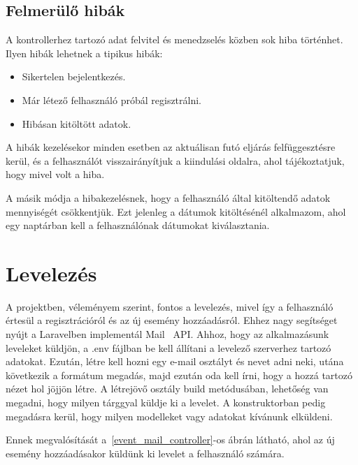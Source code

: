 \documentclass[
]{thesis-ekf}
\theoremstyle{definition}
\theoremstyle{remark}
\begin{document}
	\subsection{Felmerülő hibák}
	A kontrollerhez tartozó adat felvitel és menedzselés közben sok hiba történhet. Ilyen hibák lehetnek a tipikus hibák:
	\begin{itemize}
		\item Sikertelen bejelentkezés. 
		\item Már létező felhasználó próbál regisztrálni.
		\item Hibásan kitöltött adatok.
	\end{itemize}
	A hibák kezelésekor minden esetben az aktuálisan futó eljárás felfüggesztésre kerül, és a felhasználót visszairányítjuk a kiindulási oldalra, ahol tájékoztatjuk, hogy mivel volt a hiba. 
	
	A másik módja a hibakezelésnek, hogy a felhasználó által kitöltendő adatok mennyiségét csökkentjük. Ezt jelenleg a dátumok kitöltésénél alkalmazom, ahol egy naptárban kell a felhasználónak dátumokat kiválasztania. 
	
	\section{Levelezés}
	A projektben, véleményem szerint, fontos a levelezés, mivel így a felhasználó értesül a regisztrációról és az új esemény hozzáadásról. Ehhez nagy segítséget nyújt a Laravelben implementál Mail~\cite{laravel_mail} API. Ahhoz, hogy az alkalmazásunk leveleket küldjön, a .env fájlban be kell állítani a levelező szerverhez tartozó adatokat. Ezután, létre kell hozni egy e-mail osztályt és nevet adni neki, utána következik a formátum megadás, majd ezután oda kell írni, hogy a hozzá tartozó nézet hol jöjjön létre. A létrejövő osztály build metódusában, lehetőség van megadni, hogy milyen tárggyal küldje ki a levelet. A konstruktorban pedig megadásra kerül, hogy milyen modelleket vagy adatokat kívánunk elküldeni.
	
	Ennek megvalósítását a~\ref{event_mail_controller}-os ábrán látható, ahol az új esemény hozzáadásakor küldünk ki levelet a felhasználó számára.
	
	
	
\end{document}
